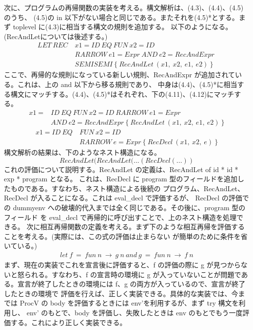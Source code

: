 \documentclass{jreport}
\begin{document}
			次に、プログラムの再帰関数の実装を考える。構文解析は、(4.3)、(4.4)、(4.5)のうち、
			(4.5)の in 以下がない場合と同じである。またそれを(4.5)*とする。まず toplevel に(4.3)に相当する構文の規則を追加する。
			以下のようになる。(RecAndLetについては後述する。)
\begin{equation}
	\begin{split}
		LET \ REC \ &x1=ID \ EQ \ FUN \ x2=ID \ \\ &RARROW \ e1=Expr \ AND \ e2=RecAndExpr \ \\ &SEMISEMI \ \{ \ RecAndLet \ (x1, \ x2, \ e1, \ e2) \ \}
	\end{split}
\end{equation}
			ここで、再帰的な規則になっている新しい規則、RecAndExpr が追加されている。これは、上の and 以下から移る規則であり、
			中身は(4.4)、(4.5)*に相当する構文にマッチする。(4.4)、(4.5)*はそれぞれ、下の(4.11)、(4.12)にマッチする。
\begin{equation}
	\begin{split}
		x1=&ID \ EQ \ FUN \ x2=ID \ RARROW \ e1=Expr \ \\ &AND \ e2=RecAndExpr \ \{ \ RecAndLet \ (x1, \ x2, \ e1, \ e2) \ \}
	\end{split}
\end{equation}
\begin{equation}
	\begin{split}
		x1=ID \ EQ \ &FUN \ x2=ID \ \\ &RARROW \ e=Expr \ \{ \ RecDecl \ (x1, \ x2, \ e) \ \}
	\end{split}
\end{equation}
			構文解析の結果は、下のようなネスト構造になる。
\begin{equation}RecAndLet(RecAndLet(...(RecDecl(...))\end{equation}
			これの評価について説明する。RecAndLet の定義は、RecAndLet of id * id * exp * program となる。
			これは、RecDecl に program 型のフィールドを追加したものである。すなわち、ネスト構造による後続の
			プログラム、RecAndLet、RecDecl が入ることになる。これは eval\_decl で評価するが、
			RecDecl の評価での dummyenv への破壊的代入までは全く同じである。その後に、program 型のフィールド
			を eval\_decl で再帰的に呼び出すことで、上のネスト構造を処理できる。
			次に相互再帰関数の定義を考える。まず下のような相互再帰を評価することを考える。(実際には、この式の評価は止まらない
			が簡単のために条件を省いている。)
\begin{equation}
	\begin{split}
		let \ f \ = \ fun \ n \ \rightarrow \ g \ n \ and \ g \ = \ fun \ n \ \rightarrow \ f \ n
	\end{split}
\end{equation}
			まず、現在の実装でこれを宣言後に評価すると、f の評価の際に g が見つからないと怒られる。すなわち、f の宣言時の環境に g 
			が入っていないことが問題である。宣言が終了したときの環境には f、g の両方が入っているので、宣言が終了したときの環境で
			評価を行えば、正しく実装できる。具体的な実装では、今までは ProcV の body を評価するときには env'を利用するが、まず try 構文を利用し、
			env' のもとで、body を評価し、失敗したときは env のもとでもう一度評価する。これにより正しく実装できる。
\end{document}
